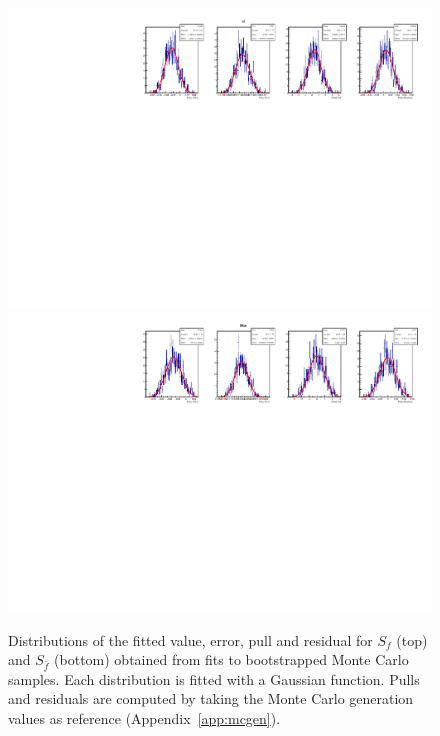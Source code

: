 \begin{figure}[t]
        \begin{center}
                \includegraphics[width=1.0\textwidth]{05DecaytimeFit/figs/MCclosureTest/1DPullPlot_Sf_SSbarAccAsymmFTFloatDMGammaConstrAllSamples.pdf} \\
                \includegraphics[width=1.0\textwidth]{05DecaytimeFit/figs/MCclosureTest/1DPullPlot_Sfbar_SSbarAccAsymmFTFloatDMGammaConstrAllSamples.pdf}
        \end{center}
        \vspace{-2mm}
        \caption{Distributions of the fitted value, error, pull and residual for $S_f$ (top) and $S_{\bar f}$ (bottom) obtained from
        fits to bootstrapped Monte Carlo samples. Each distribution is fitted with a Gaussian function. Pulls and residuals are computed
        by taking the Monte Carlo generation values as reference (Appendix~\ref{app:mcgen}).}
        \label{fig:mc_bootstrap_cp}
\end{figure}
